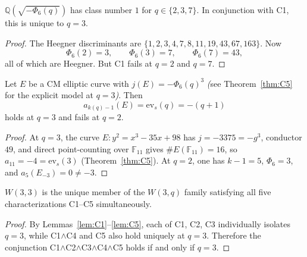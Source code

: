 \begin{lemma}[C4]\label{lem:C4}
$\mathbb{Q}(\sqrt{-\Phi_6(q)})$ has class number $1$ for $q\in\{2,3,7\}$.
In conjunction with C1, this is unique to $q=3$.
\end{lemma}
\begin{proof}
The Heegner discriminants are
$\{1,2,3,4,7,8,11,19,43,67,163\}$.
Now
\[
  \Phi_6(2)=3,\qquad \Phi_6(3)=7,\qquad \Phi_6(7)=43,
\]
all of which are Heegner. But C1 fails at $q=2$ and $q=7$.
\end{proof}

\begin{lemma}[C5]\label{lem:C5}
Let $E$ be a CM elliptic curve with $j(E)=-\Phi_6(q)^3$
\emph{(}see Theorem~\ref{thm:C5} for the explicit model at $q=3$\emph{)}. Then
\[
  a_{k(q)-1}(E) = \mathrm{ev}_s(q)=-(q+1)
\]
holds at $q=3$ and fails at $q=2$.
\end{lemma}
\begin{proof}
At $q=3$, the curve $E\colon y^2=x^3-35x+98$ has $j=-3375=-g^3$,
conductor $49$, and direct point-counting over $\mathbb{F}_{11}$ gives
$\#E(\mathbb{F}_{11})=16$, so $a_{11}=-4=\mathrm{ev}_s(3)$
(Theorem~\ref{thm:C5}).
At $q=2$, one has $k-1=5$, $\Phi_6=3$, and $a_5(E_{-3})=0\neq -3$.
\end{proof}

\begin{theorem}[W(3,3) Uniqueness]\label{thm:uniqueness}
$W(3,3)$ is the unique member of the $W(3,q)$ family satisfying
all five characterizations C1--C5 simultaneously.
\end{theorem}
\begin{proof}
By Lemmas~\ref{lem:C1}--\ref{lem:C5}, each of C1, C2, C3 individually isolates $q=3$,
while C1$\wedge$C4 and C5 also hold uniquely at $q=3$.
Therefore the conjunction C1$\wedge$C2$\wedge$C3$\wedge$C4$\wedge$C5
holds if and only if $q=3$.
\end{proof}
